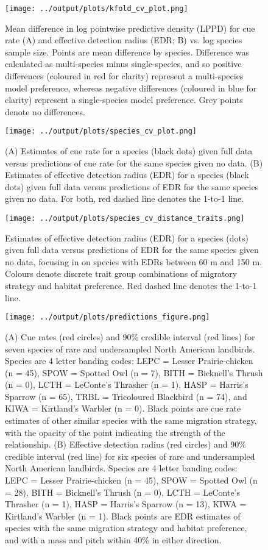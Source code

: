 \documentclass[12pt]{article}
\begin{document}
\begin{figure}[h]
	\texttt{[image: ../output/plots/kfold\_cv\_plot.png]}
	\caption{Mean difference in log pointwise predictive density (LPPD) for cue rate (A) and effective detection radius (EDR; B) vs. log species sample size. Points are mean difference by species. Difference was calculated as multi-species minus single-species, and so positive differences (coloured in red for clarity) represent a multi-species model preference, whereas negative differences (coloured in blue for clarity) represent a single-species model preference. Grey points denote no differences. }
	\label{fig:cv}
\end{figure}

\begin{figure}[h]
	\texttt{[image: ../output/plots/species\_cv\_plot.png]}
	\caption{(A) Estimates of cue rate for a species (black dots) given full data versus predictions of cue rate for the same species given no data. (B) Estimates of effective detection radius (EDR) for a species (black dots) given full data versus predictions of EDR for the same species given no data. For both, red dashed line denotes the 1-to-1 line.}
	\label{fig:species_cv}
\end{figure}

\begin{figure}[h]
	\texttt{[image: ../output/plots/species\_cv\_distance\_traits.png]}
	\caption{Estimates of effective detection radius (EDR) for a species (dots) given full data versus predictions of EDR for the same species given no data, focusing in on species with EDRs between 60 m and 150 m. Colours denote discrete trait group combinations of migratory strategy and habitat preference. Red dashed line denotes the 1-to-1 line.}
	\label{fig:distance_cv_traits}
\end{figure}

\begin{figure}[h]
	\texttt{[image: ../output/plots/predictions\_figure.png]}
	\caption{(A) Cue rates (red circles) and 90\% credible interval (red lines) for seven species of rare and undersampled North American landbirds. Species are 4 letter banding codes: LEPC = Lesser Prairie-chicken (n = 45), SPOW = Spotted Owl (n = 7), BITH = Bicknell's Thrush (n = 0), LCTH = LeConte's Thrasher (n = 1), HASP = Harris's Sparrow (n = 65), TRBL = Tricoloured Blackbird (n = 74), and KIWA = Kirtland's Warbler (n = 0). Black points are cue rate estimates of other similar species with the same migration strategy, with the opacity of the point indicating the strength of the relationship. (B) Effective detection radius (red circles) and 90\% credible interval (red line) for six species of rare and undersampled North American landbirds. Species are 4 letter banding codes: LEPC = Lesser Prairie-chicken (n = 45), SPOW = Spotted Owl (n = 28), BITH = Bicknell's Thrush (n = 0), LCTH = LeConte's Thrasher (n = 1), HASP = Harris's Sparrow (n = 13), KIWA = Kirtland's Warbler (n = 1). Black points are EDR estimates of species with the same migration strategy and habitat preference, and with a mass and pitch within 40\% in either direction.}
	\label{fig:predictions}
\end{figure}
\end{document}
